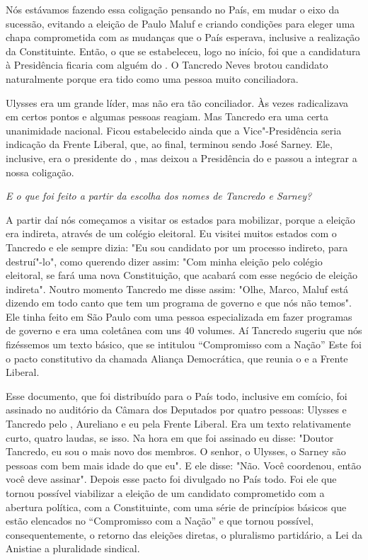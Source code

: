 Nós estávamos fazendo essa coligação pensando no País, em mudar o eixo
da sucessão, evitando a eleição de Paulo Maluf e criando condições para
eleger uma chapa comprometida com as mudanças que o País esperava,
inclusive a realização da Constituinte. Então, o que se estabeleceu,
logo no início, foi que a candidatura à Presidência ficaria com alguém
do . O Tancredo Neves brotou candidato naturalmente porque era tido
como uma pessoa muito conciliadora.

Ulysses era um grande líder, mas não era tão conciliador. Às vezes
radicalizava em certos pontos e algumas pessoas reagiam. Mas Tancredo
era uma certa unanimidade nacional. Ficou estabelecido ainda que a
Vice"-Presidência seria indicação da Frente Liberal, que, ao final,
terminou sendo José Sarney. Ele, inclusive, era o presidente do , mas
deixou a Presidência do  e passou a integrar a nossa coligação.

\medskip

\noindent\emph{E o que foi feito a partir da escolha dos nomes de Tancredo e
Sarney? }

A partir daí nós começamos a visitar os estados para
mobilizar, porque a eleição era indireta, através de um colégio
eleitoral. Eu visitei muitos estados com o Tancredo e ele sempre dizia:
"Eu sou candidato por um processo indireto, para destruí"-lo", como
querendo dizer assim: "Com minha eleição pelo colégio eleitoral, se fará
uma nova Constituição, que acabará com esse negócio de eleição
indireta". Noutro momento Tancredo me disse assim: "Olhe, Marco, Maluf
está dizendo em todo canto que tem um programa de governo e que nós não
temos". Ele tinha feito em São Paulo com uma pessoa especializada em
fazer programas de governo e era uma coletânea com uns 40 volumes. Aí
Tancredo sugeriu que nós fizéssemos um texto básico, que se intitulou
``Compromisso com a Nação'' Este foi o pacto constitutivo da chamada
Aliança Democrática, que reunia o  e a Frente Liberal.

Esse documento, que foi distribuído para o País todo, inclusive em
comício, foi assinado no auditório da Câmara dos Deputados por quatro
pessoas: Ulysses e Tancredo pelo , Aureliano e eu pela Frente
Liberal. Era um texto relativamente curto, quatro laudas, se isso. Na
hora em que foi assinado eu disse: "Doutor Tancredo, eu sou o mais novo
dos membros. O senhor, o Ulysses, o Sarney são pessoas com bem mais
idade do que eu". E ele disse: "Não. Você coordenou, então você deve
assinar". Depois esse pacto foi divulgado no País todo. Foi ele que
tornou possível viabilizar a eleição de um candidato comprometido com a
abertura política, com a Constituinte, com uma série de princípios
básicos que estão elencados no ``Compromisso com a Nação'' e que tornou
possível, consequentemente, o retorno das eleições diretas, o pluralismo
partidário, a Lei da Anistiae a pluralidade sindical.

